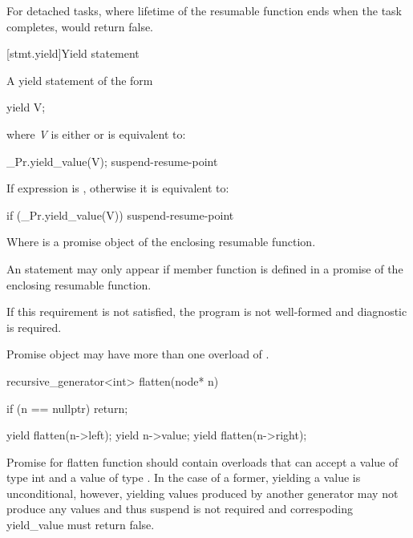 For detached tasks, where lifetime of the resumable function ends
when the task completes,  would return false.
\exitnote

[stmt.yield]{Yield statement}%

\pnum
A yield statement of the form

\begin{codeblock}
	yield V;
\end{codeblock}

where \textit{V} is either  or  is equivalent to:

\begin{codeblock}
	_Pr.yield_value(V);
	suspend-resume-point
\end{codeblock}

If  expression is , otherwise it is equivalent to:

\begin{codeblock}
	if (_Pr.yield_value(V)) {
		suspend-resume-point
	}
\end{codeblock}

Where  is a promise object of the enclosing resumable function.

\pnum
An  statement may only appear if  member
function is defined in a promise of the enclosing resumable function.

If this requirement is not satisfied, the program is not well-formed and diagnostic is required.

\pnum
Promise object may have more than one overload of .

\enterexample
\begin{codeblock}
	recursive_generator<int> flatten(node* n)
	{
		if (n == nullptr)
			return;
			
		yield flatten(n->left);
		yield n->value;
		yield flatten(n->right);
	}
\end{codeblock}

Promise for flatten function should contain overloads that can accept a value of type int and a value of type .
In the case of a former, yielding a value is unconditional, however, yielding values produced by another generator may not produce
any values and thus suspend is not required and correspoding yield_value must return false. 
\exitexample